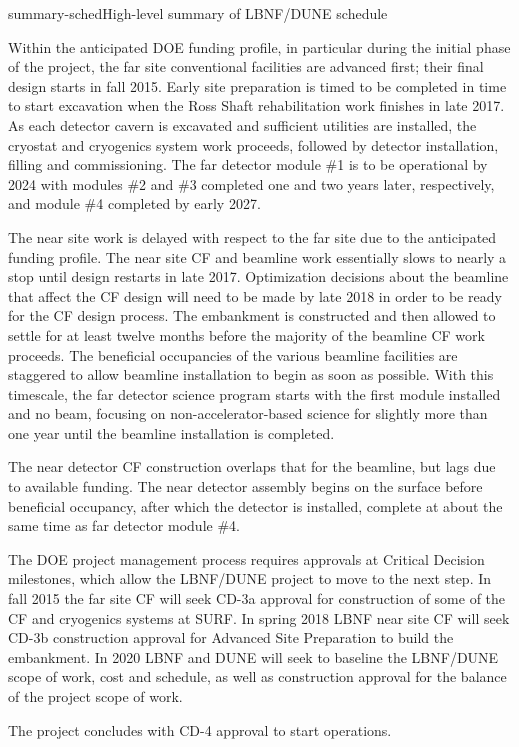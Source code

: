 \begin{dunefigure}{summary-sched}{High-level summary of LBNF/DUNE schedule}
\end{dunefigure}


Within the anticipated DOE funding profile, in particular during the initial phase of the project, the far site conventional
facilities are advanced first; their final design starts in fall 2015. Early site preparation is timed to be completed 
in time to start excavation when the Ross Shaft rehabilitation work finishes
 in late 2017. As each detector 
 cavern is excavated and sufficient utilities are installed, the cryostat and cryogenics system work proceeds, followed by detector installation, filling and commissioning. 
 The far detector module \#1 is to be operational by 2024 with modules \#2 and \#3 completed
 one and two years later, respectively, and module \#4 completed by early 2027.

The near site work is delayed with respect to the far site due to the anticipated funding profile. The near site CF and beamline work essentially slows to nearly a stop %
until design restarts in late 2017. Optimization decisions about the beamline that affect the CF design will need to be made by late 2018 in order to be ready for the CF design process. The embankment is constructed and then allowed to settle for at least twelve months before the majority of the beamline CF work proceeds. The beneficial occupancies of the various beamline facilities %
are staggered to allow beamline installation to begin as soon as possible. With this timescale, the far detector science program %
starts with the first module installed and no beam, focusing on non-accelerator-based science %
for slightly more than one year until 
the beamline installation is completed.


The near detector CF construction overlaps that for the beamline, but lags due to available funding. The near detector assembly begins on the surface before beneficial occupancy, after which the detector is installed, complete at about the same time as far detector module \#4. 

The DOE project management process requires approvals at Critical Decision milestones, which allow the LBNF/DUNE project to move to the next step. In fall 2015 the far site CF will seek CD-3a approval for construction of some of the CF and cryogenics systems at SURF. In spring 2018 LBNF near site CF will seek CD-3b construction approval for Advanced Site Preparation to build the embankment. In 2020 LBNF and DUNE will seek to baseline the LBNF/DUNE scope of work, cost and schedule, as well as construction approval for the balance of the project scope of work. 

The project concludes with CD-4 approval to start operations.

